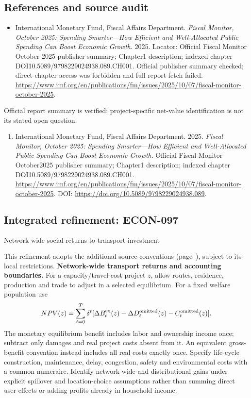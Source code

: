 \documentclass[11pt,a4paper]{article}
\begin{document}
\subsection*{References and source audit}
\begin{itemize}
\item International Monetary Fund, Fiscal Affairs Department. \emph{Fiscal Monitor, October 2025: Spending Smarter—How Efficient and Well-Allocated Public Spending Can Boost Economic Growth}. 2025. Locator: Official Fiscal Monitor October 2025 publisher summary; Chapter1 description; indexed chapter DOI10.5089/9798229024938.089.CH001. Official publisher summary checked; direct chapter access was forbidden and full report fetch failed. \url{https://www.imf.org/en/publications/fm/issues/2025/10/07/fiscal-monitor-october-2025}.
\end{itemize}
Official report summary is verified; project-specific net-value identification is not its stated open question.
\begin{enumerate}\raggedright
\item\hypertarget{definitions:source:30007533:1}{} International Monetary Fund, Fiscal Affairs Department. 2025. \emph{Fiscal Monitor, October 2025: Spending Smarter—How Efficient and Well-Allocated Public Spending Can Boost Economic Growth}. Official Fiscal Monitor October2025 publisher summary; Chapter1 description; indexed chapter DOI10.5089/9798229024938.089.CH001.
\url{https://www.imf.org/en/publications/fm/issues/2025/10/07/fiscal-monitor-october-2025}.
DOI: \url{https://doi.org/10.5089/9798229024938.089}.
\end{enumerate}

\subsection*{Integrated refinement: ECON-097}
{\sffamily\small\color{muted}Network-wide social returns to transport investment\par}
This refinement adopts the additional source conventions
(page~\pageref{audited:conventions}), subject to its local restrictions.
\textbf{Network-wide transport returns and accounting boundaries.}
For a capacity/travel-cost project $z$, allow routes, residence, production and
trade to adjust in a selected equilibrium. For a fixed welfare population use
\[
NPV(z)=\sum_{t=0}^{T}\delta^t
[\Delta B_t^{\rm eq}(z)-\Delta D_t^{\rm omitted}(z)-C_t^{\rm omitted}(z)].
\]
The monetary equilibrium benefit includes labor and ownership income once;
subtract only damages and real project costs absent from it. An equivalent
gross-benefit convention instead includes all real costs exactly once.
Specify life-cycle construction, maintenance, delay, congestion, safety and
environmental costs with a common numeraire. Identify network-wide and
distributional gains under explicit spillover and location-choice assumptions
rather than summing direct user effects or adding profits already in household
income.
\end{document}
